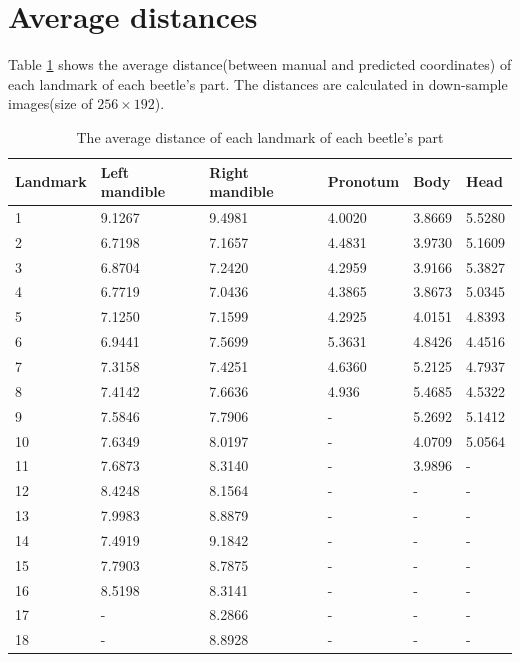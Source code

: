 \documentclass[12pt,a4paper]{article}
\begin{document}
\section{Average distances}
\label{apavgdistance}
Table \ref{avgdistance} shows the average distance(between manual and predicted coordinates) of each landmark of each beetle's part. The distances are calculated in down-sample images(size of $256 \times 192$).
\begin{table}[h!]
	\centering
	\begin{tabular}{l p{3cm} p{3cm}  p{2cm}  p{2cm} p{2cm}   }
		Landmark &  Left mandible & Right mandible & Pronotum & Body & Head  \\ \hline
 		1 & 9.1267 & 9.4981 & 4.0020 & 3.8669 & 5.5280 \\ \hline
		2 & 6.7198 & 7.1657 & 4.4831 & 3.9730 & 5.1609 \\ \hline
		3 & 6.8704 & 7.2420 & 4.2959 & 3.9166 & 5.3827 \\ \hline
		4 & 6.7719 & 7.0436 & 4.3865 & 3.8673 & 5.0345 \\ \hline
		5 & 7.1250 & 7.1599 & 4.2925 & 4.0151 & 4.8393 \\ \hline
		6 & 6.9441 & 7.5699 & 5.3631 & 4.8426 & 4.4516 \\ \hline
		7 & 7.3158 & 7.4251 & 4.6360 & 5.2125 & 4.7937 \\ \hline
		8 & 7.4142 & 7.6636 & 4.936 & 5.4685 & 4.5322 \\ \hline
		9 & 7.5846 & 7.7906 & - & 5.2692 & 5.1412 \\ \hline
		10 & 7.6349 & 8.0197 & - & 4.0709 & 5.0564 \\ \hline
		11 & 7.6873 & 8.3140 & - & 3.9896 & - \\ \hline
		12 & 8.4248 & 8.1564 & - & - & - \\ \hline
		13 & 7.9983 & 8.8879 & - & - & - \\ \hline
		14 & 7.4919 & 9.1842 & - & - & - \\ \hline
		15 & 7.7903 & 8.7875 & - & - & - \\ \hline
		16 & 8.5198 & 8.3141 & - & - & - \\ \hline
		17 & - & 8.2866 & - & - & - \\ \hline
		18 & - & 8.8928 & - & - & - \\ \hline
	\end{tabular}
	\caption{The average distance of each landmark of each beetle's part}
	\label{avgdistance}
\end{table}~\\
\end{document}
